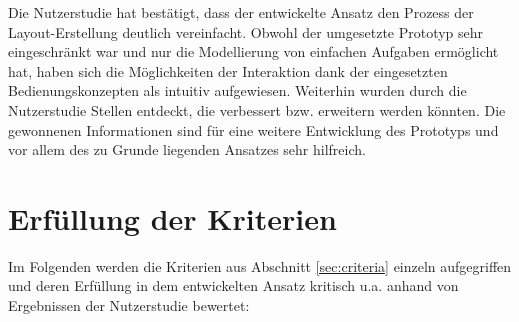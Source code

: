 Die Nutzerstudie hat bestätigt, dass der entwickelte Ansatz den Prozess der Layout-Erstellung deutlich vereinfacht. Obwohl der umgesetzte Prototyp sehr eingeschränkt war und nur die Modellierung von einfachen Aufgaben ermöglicht hat, haben sich die Möglichkeiten der Interaktion dank der eingesetzten Bedienungskonzepten als intuitiv aufgewiesen. Weiterhin wurden durch die Nutzerstudie Stellen entdeckt, die verbessert bzw. erweitern werden könnten. Die gewonnenen Informationen sind für eine weitere Entwicklung des Prototyps und vor allem des zu Grunde liegenden Ansatzes sehr hilfreich.

\section{Erfüllung der Kriterien}
\label{sec:criteria-evaluation}

Im Folgenden werden die Kriterien aus Abschnitt \ref{sec:criteria} einzeln aufgegriffen und deren Erfüllung in dem entwickelten Ansatz kritisch u.a. anhand von Ergebnissen der Nutzerstudie bewertet:


